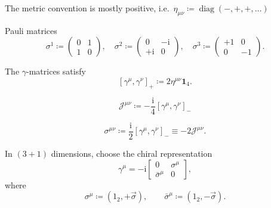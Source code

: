 \documentclass[12pt]{article}
\newcommand\mi{\mathrm{i}} %
\DeclareMathOperator{\diag}{diag}
\newcommand{\rbr}[1]{{\left(#1\right)}}
\newcommand{\sbr}[1]{{\left[#1\right]}}
\newcommand{\rfun}[2]{{#1}\mathopen{}\left(#2\right)\mathclose{}}
\begin{document}
The metric convention is mostly positive, i.e.\
$\eta_{\mu\nu} \coloneqq \rfun{\diag}{-, +, +, \ldots}$

Pauli matrices
\begin{equation}
\sigma^1 \coloneqq \begin{pmatrix} 0 & 1 \\ 1 & 0 \end{pmatrix},\quad
\sigma^2 \coloneqq \begin{pmatrix} 0 & -\mi \\ +\mi & 0 \end{pmatrix},\quad
\sigma^3 \coloneqq \begin{pmatrix} +1 & 0 \\ 0 & -1 \end{pmatrix}.
\end{equation}

The $\gamma$-matrices satisfy \citep[sec.~5]{weinberg1995}
\begin{equation}
\sbr{\gamma^\mu, \gamma^\nu}_+ \coloneqq 2\eta^{\mu\nu} \mathbf{1}_4.
\end{equation}

\begin{equation}
\mathscr{J}^{\mu\nu} \coloneqq -\frac{\mi}{4}\sbr{\gamma^\mu, \gamma^\nu}_-
\end{equation}

\begin{equation}
\sigma^{\mu\nu} \coloneqq \frac{\mi}{2}\sbr{\gamma^\mu, \gamma^\nu}_-
\equiv -2 \mathscr{J}^{\mu\nu}.
\end{equation}

In $\rbr{3+1}$ dimensions, choose the chiral representation
\begin{equation}
\gamma^\mu = -\mi
\begin{bmatrix}0 & \sigma^\mu \\ \bar\sigma^\mu & 0\end{bmatrix},
\end{equation}
where
\begin{equation}
\sigma^\mu \coloneqq \rbr{1_2, +\vec{\sigma}},\qquad
\bar\sigma^\mu \coloneqq \rbr{1_2, -\vec{\sigma}}.
\end{equation}
\end{document}
